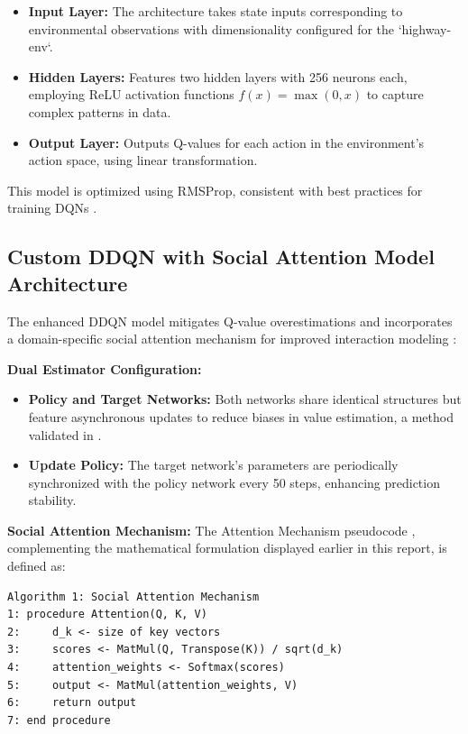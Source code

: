 \documentclass{article}
\begin{document}
\begin{itemize}
    \item \textbf{Input Layer:} The architecture takes state inputs corresponding to environmental observations with dimensionality configured for the `highway-env`.
    \item \textbf{Hidden Layers:} Features two hidden layers with 256 neurons each, employing ReLU activation functions \( f(x) = \max(0, x) \) to capture complex patterns in data.
    \item \textbf{Output Layer:} Outputs Q-values for each action in the environment's action space, using linear transformation.
\end{itemize}

This model is optimized using RMSProp, consistent with best practices for training DQNs \citep{mnih2015humanlevel}.

\subsection{Custom DDQN with Social Attention Model Architecture}
The enhanced DDQN model mitigates Q-value overestimations and incorporates a domain-specific social attention mechanism for improved interaction modeling \citep{leurent2019social}:

\textbf{Dual Estimator Configuration:}
\begin{itemize}
    \item \textbf{Policy and Target Networks:} Both networks share identical structures but feature asynchronous updates to reduce biases in value estimation, a method validated in \citep{DBLP:journals/corr/HasseltGS15}.
    \item \textbf{Update Policy:} The target network's parameters are periodically synchronized with the policy network every 50 steps, enhancing prediction stability.
\end{itemize}

\textbf{Social Attention Mechanism:}
The Attention Mechanism pseudocode \citep{DBLP:journals/corr/VaswaniSPUJGKP17}, complementing the mathematical formulation displayed earlier in this report, is defined as:

\begin{verbatim}
Algorithm 1: Social Attention Mechanism
1: procedure Attention(Q, K, V)
2:     d_k <- size of key vectors
3:     scores <- MatMul(Q, Transpose(K)) / sqrt(d_k)
4:     attention_weights <- Softmax(scores)
5:     output <- MatMul(attention_weights, V)
6:     return output
7: end procedure
\end{verbatim}
\end{document}
